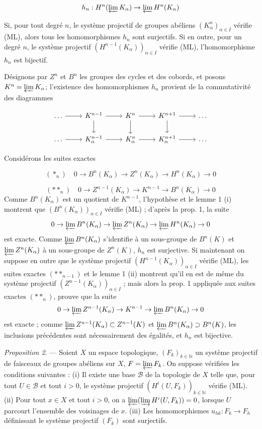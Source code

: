 $$ h_n : H^n(\varprojlim K_\alpha) \to \varprojlim H^n(K_\alpha) $$

Si, pour tout degré $n$, le système projectif de groupes abéliens $(K^n_\alpha)_{\alpha \in I}$ vérifie (ML), alors tous les homomorphismes $h_n$ sont surjectifs. Si en outre, pour un degré $n$, le système projectif $(H^{n-1}(K_\alpha))_{\alpha \in I}$ vérifie (ML), l'homomorphisme $h_n$ est bijectif.

Désignons par $Z^n$ et $B^n$ les groupes des cycles et des cobords, et posons $K^n = \varprojlim K_\alpha$; l'existence des homomorphismes $h_n$ provient de la commutativité des diagrammes

$$
\begin{tikzcd}
\dots \arrow[r] & K^{n-1} \arrow[d] \arrow[r] & K^n \arrow[d] \arrow[r] & K^{n+1} \arrow[d] \arrow[r] & \dots \\
\dots \arrow[r] & K^{n-1}_\alpha \arrow[r] & K^n_\alpha \arrow[r] & K^{n+1}_\alpha \arrow[r] & \dots
\end{tikzcd}
$$

Considérons les suites exactes

$$ (*_n) \quad 0 \to B^n(K_\alpha) \to Z^n(K_\alpha) \to H^n(K_\alpha) \to 0 $$

\newpage


$$(**_n) \quad 0 \to Z^{n-1}(K_\alpha) \to K^{n-1} \to B^n(K_\alpha) \to 0$$
Comme $B^n(K_\alpha)$ est un quotient de $K^{n-1}$, l'hypothèse et le lemme 1 (i) montrent que $(B^n(K_\alpha))_{\alpha \in I}$ vérifie (ML) ; d'après la prop. 1, la suite
$$0 \to \varprojlim B^n(K_\alpha) \to \varprojlim Z^n(K_\alpha) \to \varprojlim H^n(K_\alpha) \to 0$$
est exacte. Comme $\varprojlim B^n(K_\alpha)$ s'identifie à un sous-groupe de $B^n(K)$ et $\varprojlim Z^n(K_\alpha)$ à un sous-groupe de $Z^n(K)$, $h_n$ est surjective. Si maintenant on suppose en outre que le système projectif $(H^{n-1}(K_\alpha))_{\alpha \in I}$ vérifie (ML), les suites exactes $(**_{n-1})$ et le lemme 1 (ii) montrent qu'il en est de même du système projectif $(Z^{n-1}(K_\alpha))_{\alpha \in I}$ ; mais alors la prop. 1 appliquée aux suites exactes $(**_n)$, prouve que la suite
$$0 \to \varprojlim Z^{n-1}(K_\alpha) \to K^{n-1} \to \varprojlim B^n(K_\alpha) \to 0$$
est exacte ; comme $\varprojlim Z^{n-1}(K_\alpha) \subset Z^{n-1}(K)$ et $\varprojlim B^n(K_\alpha) \supset B^n(K)$, les inclusions précédentes sont nécessairement des égalités, et $h_n$ est bijective.

\emph{Proposition 2.} — Soient $X$ un espace topologique, $(F_k)_{k \in \mathbb{N}}$ un système projectif de faisceaux de groupes abéliens sur $X$, $F = \varprojlim F_k$. On suppose vérifiées les conditions suivantes :
(i) Il existe une base $\mathcal{B}$ de la topologie de $X$ telle que, pour tout $U \in \mathcal{B}$ et tout $i > 0$, le système projectif $(H^i(U, F_k))_{k \in \mathbb{N}}$ vérifie (ML).
(ii) Pour tout $x \in X$ et tout $i > 0$, on a $\varprojlim (\varinjlim H^i(U, F_k)) = 0$, lorsque $U$ parcourt l'ensemble des voisinages de $x$.
(iii) Les homomorphismes $u_{hk}: F_k \to F_h$ définissant le système projectif $(F_k)$ sont surjectifs.


